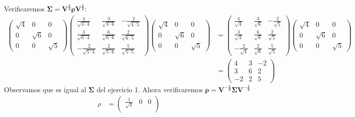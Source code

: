 \begin{sol}
\begin{align*}
\end{align*}
Verificaremos $\mathbf{\Sigma}=\mathbf{V^{\frac{1}{2}} \rho V^{\frac{1}{2}}}$:
\begin{align*}
\begin{pmatrix}
\sqrt{4} & 0 & 0 \\
0 & \sqrt{6} & 0 \\
0 & 0 & \sqrt{5}
\end{pmatrix}
\begin{pmatrix}
\frac{4}{\sqrt{4\cdot 4}} & \frac{3}{\sqrt{4 \cdot 6}} & -\frac{2}{\sqrt{4 \cdot 5}} \\
\frac{3}{\sqrt{6 \cdot 4}} & \frac{6}{\sqrt{6\cdot 6}} & \frac{2}{\sqrt{6 \cdot 5}} \\
-\frac{2}{\sqrt{5 \cdot 4}} & \frac{2}{\sqrt{5 \cdot 6}} & \frac{5}{\sqrt{5\cdot 5}}
\end{pmatrix}                                                                                                                                                                                                       
\begin{pmatrix}
\sqrt{4} & 0 & 0 \\
0 & \sqrt{6} & 0 \\
0 & 0 & \sqrt{5}
\end{pmatrix} &= 
\begin{pmatrix}
\frac{4}{\sqrt{4}} & \frac{3}{\sqrt{6}} & -\frac{2}{\sqrt{5}} \\
\frac{3}{\sqrt{4}} & \frac{6}{\sqrt{6}} & \frac{2}{\sqrt{5}} \\
-\frac{2}{\sqrt{4}} & \frac{2}{\sqrt{6}} & \frac{5}{\sqrt{5}}
\end{pmatrix}
\begin{pmatrix}
\sqrt{4} & 0 & 0 \\
0 & \sqrt{6} & 0 \\
0 & 0 & \sqrt{5}
\end{pmatrix}\\
&=\begin{pmatrix}
4&3&-2\\
3&6&2\\
-2&2&5
\end{pmatrix}
\end{align*}
Observamos que es igual al $\mathbf{\Sigma}$ del ejercicio 1. Ahora verificaremos $\mathbf{\rho}=\mathbf{V^{-\frac{1}{2}} \Sigma V^{-\frac{1}{2}}}$
\begin{align*}
\rho &= \begin{pmatrix}
\frac{1}{\sqrt{4}} & 0 & 0 \\

\end{pmatrix}
\end{align*}
\end{sol}
